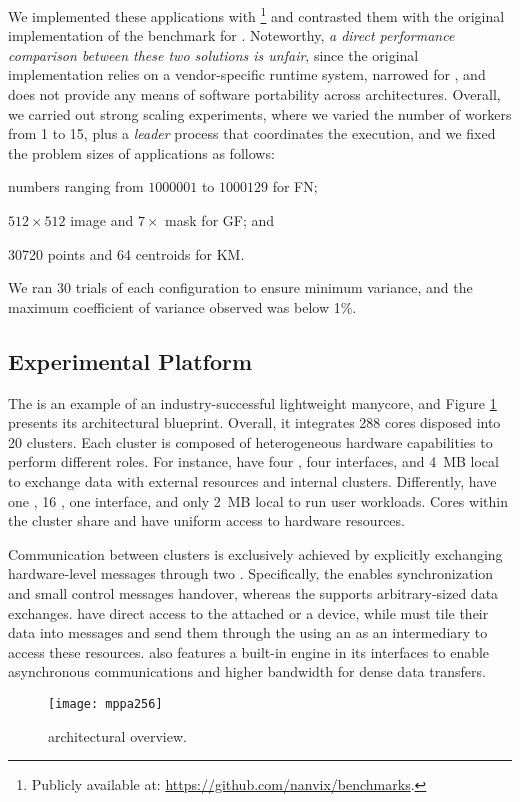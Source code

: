 	We implemented these applications with \mpi\footnote{Publicly
	available at: \url{https://github.com/nanvix/benchmarks}.} and
	contrasted them with the original implementation of the benchmark for
	\mppa. Noteworthy, \textit{a direct performance comparison between these two
	solutions is unfair}, since the original implementation relies on
	a vendor-specific runtime system, narrowed for
	\mppa, and does not provide any means of software portability across
	architectures.
	Overall, we carried out strong scaling experiments, where we varied
	the number of workers from 1 to 15, plus a \textit{leader} process that
	coordinates the execution, and we fixed the problem sizes
	of applications as follows:
	\begin{enumerate*}[label=(\roman*)]
		\item numbers ranging from $1000001$ to $1000129$ for FN;
		\item $512\times512$ image and $7\times$ mask for GF; and
		\item 30720 points and 64 centroids for KM.
	\end{enumerate*}
	We ran 30 trials of each configuration to ensure minimum variance, and
	the maximum coefficient of variance observed was below 1\%.

	\subsection{Experimental Platform}

	The \mppa is an example of an industry-successful lightweight
	manycore, and Figure \ref{figure:lightweight-manycore} presents its
	architectural blueprint.
	Overall, it integrates 288 cores disposed into 20
	clusters. Each cluster is composed of heterogeneous
	hardware capabilities to perform different roles. For instance,
	\ioclusters have four \rmans, four \noc interfaces, and 4~MB local
	\sram to exchange data with external resources and internal clusters.
	Differently, \cclusters have one \rman, 16 \pes, one \noc interface,
	and only 2~MB local \sram to run user workloads. Cores within the
	cluster share and have uniform access to hardware resources.

	Communication between clusters is exclusively achieved by explicitly
	exchanging hardware-level messages through two \nocs. Specifically,
	the \cnoc enables synchronization and small control messages handover,
	whereas the \dnoc supports arbitrary-sized data exchanges.
	\ioclusters have direct access to the attached \dram or a device,
	while \cclusters must tile their data into messages and send them
	through the \noc using an \iocluster as an intermediary to access
	these resources. \mppa also features
	a built-in \dma engine in its \noc interfaces to enable asynchronous
	communications and higher bandwidth for dense data transfers.

	\begin{figure}[t]
		\centering
		\texttt{[image: mppa256]}
		\caption{\mppa architectural overview.}
		\label{figure:lightweight-manycore}
		\vspace{-15pt}
	\end{figure}

